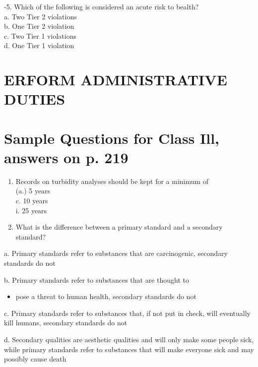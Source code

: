 \documentclass[10pt]{article}
\begin{document}
-5. Which of the following is considered an acute risk to bealth?\\
a. Two Tier 2 violations\\
b. One Tier 2 violation\\
c. Two Tier 1 violations\\
d. One Tier 1 violation

\section{ERFORM ADMINISTRATIVE DUTIES}
\section{Sample Questions for Class Ill, answers on p. 219}
\begin{enumerate}
  \item Records on turbidity analyses should be kept for a minimum of\\
(a.) 5 years\\
c. 10 years\\
i. 25 years

  \item What is the difference between a primary standard and a secondary standard?

\end{enumerate}

a. Primary standards refer to substances that are carcinogenic, secondary standards do not

b. Primary standards refer to substances that are thought to

\begin{itemize}
  \item pose a threat to human health, secondary standards do not
\end{itemize}

c. Primary standards refer to substances that, if not put in check, will eventually kill humans, secondary standards do not

d. Secondary qualities are aesthetic qualities and will only make some people sick, while primary standards refer to substances that will make everyone sick and may possibly cause death
\end{document}
